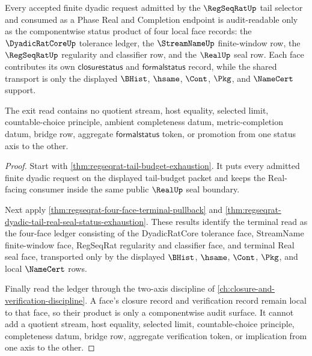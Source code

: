 \begin{theorem}
\label{thm:regseqrat-tail-budget-exit-status-product}
Every accepted finite dyadic request admitted by the $\RegSeqRatUp$ tail selector and consumed as a Phase Real and Completion endpoint is audit-readable only as the componentwise status product of four local face records: the $\DyadicRatCoreUp$ tolerance ledger, the $\StreamNameUp$ finite-window row, the $\RegSeqRatUp$ regularity and classifier row, and the $\RealUp$ seal row. Each face contributes its own $\mathsf{closurestatus}$ and $\mathsf{formalstatus}$ record, while the shared transport is only the displayed $\BHist$, $\hsame$, $\Cont$, $\Pkg$, and $\NameCert$ support.

The exit read contains no quotient stream, host equality, selected limit, countable-choice principle, ambient completeness datum, metric-completion datum, bridge row, aggregate $\mathsf{formalstatus}$ token, or promotion from one status axis to the other.
\end{theorem}
\begin{proof}
Start with \autoref{thm:regseqrat-tail-budget-exhaustion}. It puts every admitted finite dyadic request on the displayed tail-budget packet and keeps the Real-facing consumer inside the same public $\RealUp$ seal boundary.

Next apply \autoref{thm:regseqrat-four-face-terminal-pullback} and \autoref{thm:regseqrat-dyadic-tail-real-seal-status-exhaustion}. These results identify the terminal read as the four-face ledger consisting of the DyadicRatCore tolerance face, StreamName finite-window face, RegSeqRat regularity and classifier face, and terminal Real seal face, transported only by the displayed $\BHist$, $\hsame$, $\Cont$, $\Pkg$, and local $\NameCert$ rows.

Finally read the ledger through the two-axis discipline of \autoref{ch:closure-and-verification-discipline}. A face's closure record and verification record remain local to that face, so their product is only a componentwise audit surface. It cannot add a quotient stream, host equality, selected limit, countable-choice principle, completeness datum, bridge row, aggregate verification token, or implication from one axis to the other.
\end{proof}

